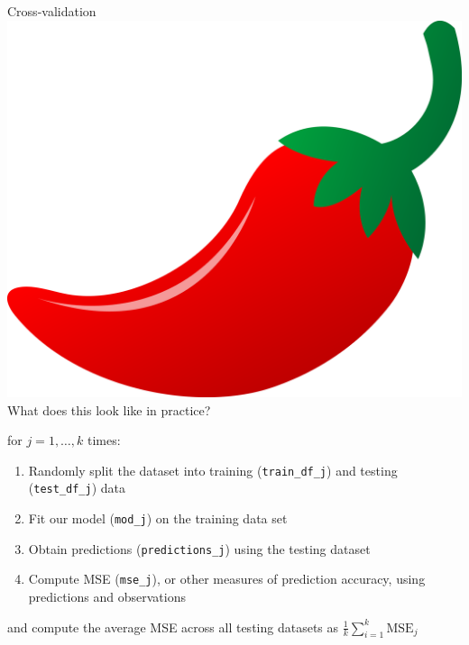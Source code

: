\documentclass[10pt,t]{beamer}
\begin{document}
\begin{frame}{Cross-validation \includegraphics[scale=0.01]{figures/chilipepper.png} }
What does this look like in practice?

\vspace{0.3cm}

for $j = 1, \dots, k$ times:

\vspace{0.3cm}

\begin{enumerate}
	\item Randomly split the dataset into training (\texttt{train\_df\_j}) and testing (\texttt{test\_df\_j}) data
	\item Fit our model (\texttt{mod\_j}) on the training data set
	\item Obtain predictions (\texttt{predictions\_j}) using the testing dataset 
	\item Compute MSE (\texttt{mse\_j}), or other measures of prediction accuracy, using predictions and observations 
\end{enumerate}

\vspace{0.3cm}

and compute the average MSE across all testing datasets as $\frac{1}{k} \sum_{i = 1}^k \text{MSE}_j$ 

\end{frame}
\end{document}
